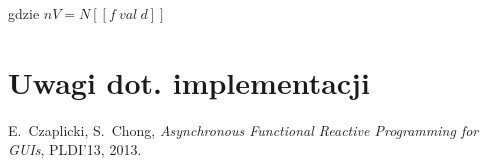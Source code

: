 \documentclass[11pt,leqno]{article}
\begin{document}
\begin{prooftree}
\end{prooftree}
gdzie $nV = N [\![f\:val\:d]\!]$

\section{Uwagi dot. implementacji}

\thispagestyle{empty}
\begin{thebibliography}{99}

   E.~Czaplicki, S.~Chong, \textit{Asynchronous Functional Reactive Programming for GUIs},
              PLDI’13, 2013.
	  
\end{thebibliography}
\end{document}
